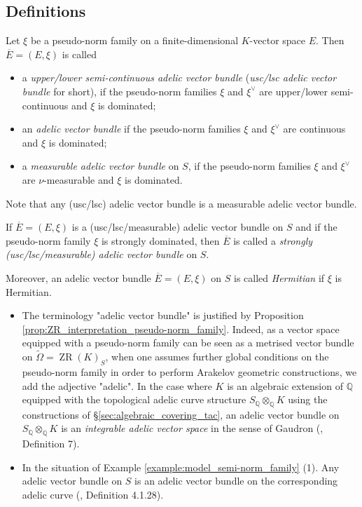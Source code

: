 \documentclass [11pt,reqno]{amsart}
\def\bQ{{\mathbb{Q}}}
\newcommand{\1}{\mathmybb{1}}
\def\ZR{\operatorname{ZR}}
\def\tilde{\widetilde}
\begin{document}
\subsection{Definitions}
\label{sub:adelic_vector_bundles_definitions}

\begin{definition}
\label{def:adelic_vector_bundle}
Let $\xi$ be a pseudo-norm family on a finite-dimensional $K$-vector space $E$. Then $\overline{E}=(E,\xi)$ is called 
\begin{itemize}
	\item[(1)] a \emph{upper/lower semi-continuous adelic vector bundle} (\emph{usc/lsc adelic vector bundle} for short), if the pseudo-norm families $\xi$ and $\xi^{\vee}$ are upper/lower semi-continuous and $\xi$ is dominated;
	\item[(2)] an \emph{adelic vector bundle} if the pseudo-norm families $\xi$ and $\xi^{\vee}$ are continuous and $\xi$ is dominated;
	\item[(3)] a \emph{measurable adelic vector bundle} on $S$, if the pseudo-norm families $\xi$ and $\xi^{\vee}$ are $\nu$-measurable and $\xi$ is dominated. 
\end{itemize}
Note that any (usc/lsc) adelic vector bundle is a measurable adelic vector bundle.

If $\overline{E}=(E,\xi)$ is a (usc/lsc/measurable) adelic vector bundle on $S$ and if the pseudo-norm family $\xi$ is strongly dominated, then $\overline{E}$ is called a \emph{strongly (usc/lsc/measurable) adelic vector bundle} on $S$. 

Moreover, an adelic vector bundle $\overline{E}=(E,\xi)$ on $S$ is called \emph{Hermitian} if $\xi$ is Hermitian.
\end{definition}

\begin{remark}
\label{rem:adelic_vector_bundle_Zariski-Riemann}
\begin{itemize}
	\item[(1)] The terminology "adelic vector bundle" is justified by Proposition \ref{prop:ZR_interpretation_pseudo-norm_family}. Indeed, as a vector space equipped with a pseudo-norm family can be seen as a metrised vector bundle on $\tilde{\Omega}=\ZR(K)_{S}$, when one assumes further global conditions on the pseudo-norm family in order to perform Arakelov geometric constructions, we add the adjective "adelic". In the case where $K$ is an algebraic extension of $\bQ$ equipped with the topological adelic curve structure $S_{\bQ}\otimes_{\bQ} K$ using the constructions of \S \ref{sec:algebraic_covering_tac}, an adelic vector bundle on $S_{\bQ}\otimes_{\bQ} K$ is an \emph{integrable adelic vector space} in the sense of Gaudron (\cite{Gaudron20}, Definition 7).
	\item[(2)] In the situation of Example \ref{example:model_semi-norm_family} (1). Any adelic vector bundle on $S$ is an adelic vector bundle on the corresponding adelic curve (\cite{ChenMori}, Definition 4.1.28).
\end{itemize}
\end{remark}
\end{document}
